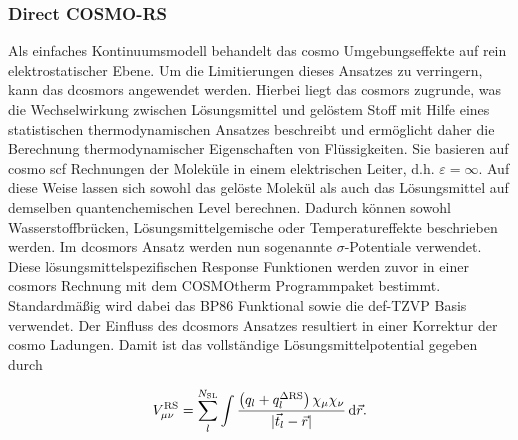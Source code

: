 	\subsubsection{Direct COSMO-RS}
Als einfaches Kontinuumsmodell behandelt das \ac{cosmo} Umgebungseffekte auf rein elektrostatischer Ebene. Um die Limitierungen dieses Ansatzes zu verringern, kann das \ac{dcosmors}\supercite{sinnecker2006calculation,klamt2011cosmo,renz2012reliable} angewendet werden. Hierbei liegt das \ac{cosmors}\supercite{klamt1995conductor,klamt1998refinement} zugrunde, was die Wechselwirkung zwischen Lösungsmittel und gelöstem Stoff mit Hilfe eines statistischen thermodynamischen Ansatzes beschreibt und ermöglicht daher die Berechnung thermodynamischer Eigenschaften von Flüssigkeiten. Sie basieren auf \ac{cosmo} \ac{scf} Rechnungen der Moleküle in einem elektrischen Leiter, d.h. $\varepsilon=\infty$. Auf diese Weise lassen sich sowohl das gelöste Molekül als auch das Lösungsmittel auf demselben quantenchemischen Level berechnen. Dadurch können sowohl Wasserstoffbrücken, Lösungsmittelgemische oder Temperatureffekte beschrieben werden.\supercite{renz2012reliable} Im \ac{dcosmors} Ansatz werden nun sogenannte $\sigma$-Potentiale verwendet. Diese lösungsmittelspezifischen Response Funktionen werden zuvor in einer \ac{cosmors} Rechnung mit dem COSMOtherm Programmpaket\supercite{cosmotherm,eckert2002fast} bestimmt. Standardmäßig wird dabei das BP86 Funktional sowie die def-TZVP Basis verwendet. Der Einfluss des \ac{dcosmors} Ansatzes resultiert in einer Korrektur der \ac{cosmo} Ladungen. \supercite{sinnecker2006calculation} Damit ist das vollständige Lösungsmittelpotential gegeben durch

\begin{equation}
V_{\mu\nu}^{\textrm{RS}}=\sum_l^{N_{\textrm{SL}}}\int\frac{\left(q_l+q_l^{\Delta \textrm{RS}}\right)\chi_\mu\chi_\nu}{\vert\vec{t}_l-\vec{r}\vert}\mathop{}\!\mathrm{d}\vec{r}.
\end{equation}
	 
